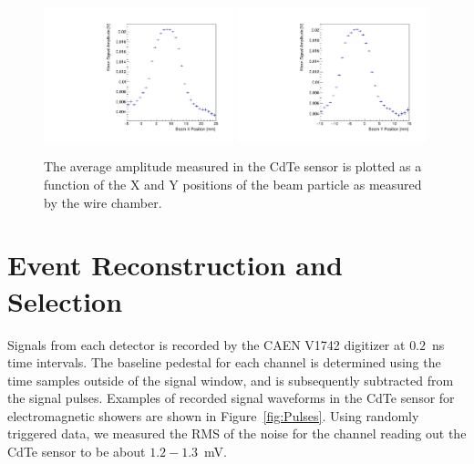 \documentclass[preprint,1p]{elsarticle}
\begin{document}
\begin{figure}[htbp] 
\centering
\includegraphics[width=0.49\textwidth]{figures/SensorXProfile.pdf} 
\includegraphics[width=0.49\textwidth]{figures/SensorYProfile.pdf} 
\caption{The average amplitude measured in the CdTe sensor is plotted as a function of 
the X and Y positions of the beam particle as measured by the wire chamber.} 
\label{fig:BeamSensorPosition} 
\end{figure} 


\section{Event Reconstruction and Selection }
\label{sec:reco}

Signals from each detector is recorded by the CAEN V1742 digitizer at $0.2$~ns time intervals.
The baseline pedestal for each channel is determined using the time samples outside of
the signal window, and is subsequently subtracted from the signal pulses. Examples of recorded
signal waveforms in the CdTe sensor for electromagnetic showers are shown in Figure~\ref{fig:Pulses}.
Using randomly triggered data, we measured the RMS of the noise for the channel reading out 
the CdTe sensor to be about $1.2-1.3$~mV. 
\end{document}
